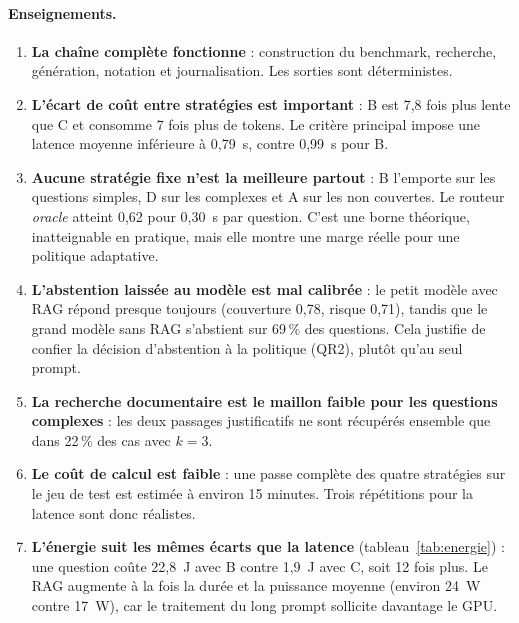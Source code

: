 \documentclass[11pt,a4paper]{article}
\begin{document}
\paragraph{Enseignements.}
\begin{enumerate}
\item \textbf{La chaîne complète fonctionne} : construction du benchmark, recherche, génération,
notation et journalisation. Les sorties sont déterministes.
\item \textbf{L'écart de coût entre stratégies est important} : B est 7,8 fois plus lente que C et
consomme 7 fois plus de tokens. Le critère principal impose une latence moyenne inférieure à 0,79~s,
contre 0,99~s pour B.
\item \textbf{Aucune stratégie fixe n'est la meilleure partout} : B l'emporte sur les questions simples,
D sur les complexes et A sur les non couvertes. Le routeur \emph{oracle} atteint 0,62 pour 0,30~s par
question. C'est une borne théorique, inatteignable en pratique, mais elle montre une marge réelle pour
une politique adaptative.
\item \textbf{L'abstention laissée au modèle est mal calibrée} : le petit modèle avec RAG répond presque
toujours (couverture 0,78, risque 0,71), tandis que le grand modèle sans RAG s'abstient sur 69\,\% des
questions. Cela justifie de confier la décision d'abstention à la politique (QR2), plutôt qu'au seul
prompt.
\item \textbf{La recherche documentaire est le maillon faible pour les questions complexes} : les deux
passages justificatifs ne sont récupérés ensemble que dans 22\,\% des cas avec $k=3$.
\item \textbf{Le coût de calcul est faible} : une passe complète des quatre stratégies sur le jeu de
test est estimée à environ 15 minutes. Trois répétitions pour la latence sont donc réalistes.
\item \textbf{L'énergie suit les mêmes écarts que la latence} (tableau~\ref{tab:energie}) : une question
coûte 22,8~J avec B contre 1,9~J avec C, soit 12 fois plus. Le RAG augmente à la fois la durée et la
puissance moyenne (environ 24~W contre 17~W), car le traitement du long prompt sollicite davantage le GPU.
\end{enumerate}
\end{document}
